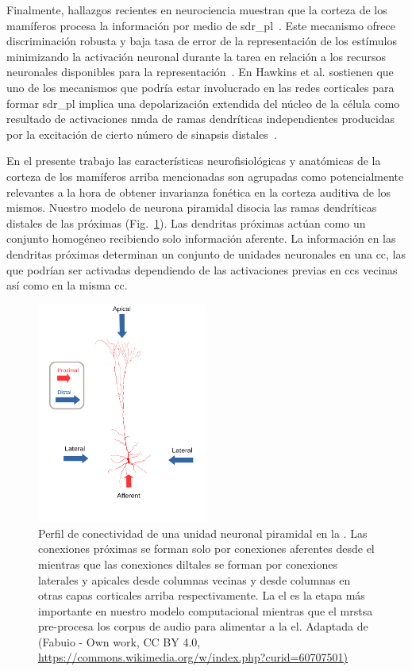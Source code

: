 {Finalmente, hallazgos recientes en neurociencia muestran que la corteza de los mamíferos procesa la información por medio de \gls{sdr_pl}~\cite{barth_2012}. Este mecanismo ofrece discriminación robusta y baja tasa de error de la representación de los estímulos minimizando la activación neuronal durante la tarea en relación a los recursos neuronales disponibles para la representación~\cite{ahmad_2016}. En Hawkins et al. \cite{hawkins_2016} sostienen que uno de los mecanismos que podría estar involucrado en las redes corticales para formar \gls{sdr_pl} implica una depolarización extendida del núcleo de la célula como resultado de activaciones \gls{nmda} de ramas dendríticas independientes producidas por la excitación de cierto número de sinapsis distales~\cite{antic_2010, major_2013}.

En el presente trabajo las características neurofisiológicas y anatómicas de la corteza de los mamíferos arriba mencionadas son agrupadas como potencialmente relevantes a la hora de obtener invarianza fonética en la corteza auditiva de los mismos. Nuestro modelo de neurona piramidal disocia las ramas dendríticas distales de las próximas (Fig.~\ref{fig:PyramidalCell}). Las dendritas próximas actúan como un conjunto homogéneo recibiendo solo información aferente. La información en las dendritas próximas determinan un conjunto de unidades neuronales en una \gls{cc}, las que podrían ser activadas dependiendo de las activaciones previas en \glspl{cc} vecinas así como en la misma \gls{cc}.

\begin{figure}[h!]
    \centering
    \includegraphics[width=0.5\textwidth]{PyramidalCell.png}
    \caption{Perfil de conectividad de una unidad neuronal piramidal en la .
	    Las conexiones próximas se forman solo por conexiones aferentes desde el 
	    mientras que las conexiones diltales se forman por conexiones laterales y apicales desde columnas vecinas y
	    desde columnas en otras capas corticales arriba respectivamente.
	    La \gls{el} es la etapa más importante en nuestro modelo computacional mientras que el \gls{mrstsa} pre-procesa los corpus de audio para alimentar a la \gls{el}.
	    Adaptada de (Fabuio - Own work, CC BY 4.0, \url{https://commons.wikimedia.org/w/index.php?curid=60707501)}}
    \label{fig:PyramidalCell}
\end{figure}

}
